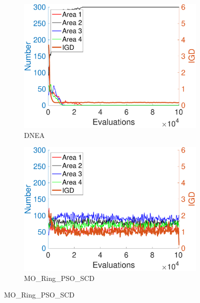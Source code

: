 \documentclass[conference]{IEEEtran}
\begin{document}
\begin{figure}[htbp]
    \centering
    \begin{subfigure}[b]{.22\textwidth}
    \includegraphics[width=\linewidth]{Section5/dim4/Diversity/DNEA}
    \caption{DNEA}
    \end{subfigure}
    \begin{subfigure}[b]{.22\textwidth}
    \includegraphics[width=\linewidth]{Section5/dim4/Diversity/MO_Ring_PSO_SCD}
    \caption{MO\_Ring\_PSO\_SCD}
    \end{subfigure}
    

\end{figure}
\end{document}

